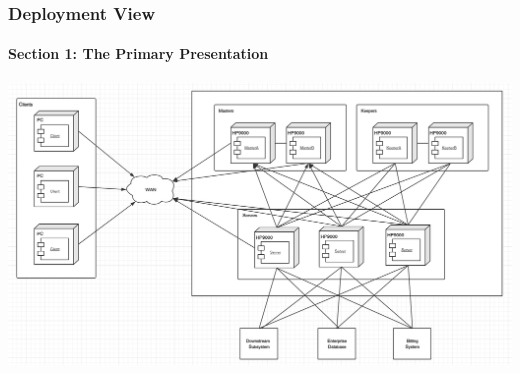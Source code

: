 \documentclass{article}
\begin{document}
		\subsubsection{Deployment View} 
			\paragraph{Section 1: The Primary Presentation}
			\begin{center}
			\includegraphics[scale=0.25]{deployment1.png}
			\end{center}
\end{document}
